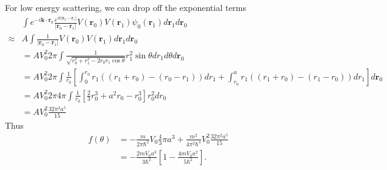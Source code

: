 For low energy scattering, we can drop off the exponential terms
\begin{align*}
            & \int e^{-i\bm k \cdot \bm r_0}
    \frac{e^{ik|\bm r_0-\bm r_1|}}{|\bm r_0 - \bm r_1|}
    V(\bm r_0)V(\bm r_1)\psi_0(\bm r_1)d\bm r_1d\bm r_0 \\
    \approx &
    A\int
    \frac{1}{|\bm r_0 - \bm r_1|}
    V(\bm r_0)V(\bm r_1)d\bm r_1d\bm r_0 \\
            & =A V_0^2 2\pi
    \int \frac{1}{\sqrt{r_0^2+r_1^2-2r_0r_1\cos\theta}}
    r_1^2\sin\theta dr_1d\theta d\bm r_0 \\
            & =AV_0^2 2\pi\int \frac{1}{r_0}\left[
                                                \int_0^{r_0}
                                                r_1((r_1+r_0)-(r_0-r_1))
                                                dr_1
                                                +
                                                \int_{r_0}^a
                                                r_1((r_1+r_0)-(r_1-r_0))
                                                dr_1
                                                \right] d\bm r_0 \\
            & =
    AV_0^2 2\pi 4\pi\int \frac{1}{r_0}
                         [\frac{2}{3}r_0^3 +a^2r_0-r_0^3 ] r_0^2d r_0 \\
            & =AV_0^2 \frac{32\pi^2a^5}{15}
\end{align*}
Thus
\begin{align*}
    f(\theta) & = -\frac{m}{2\pi\hbar^2}V_0\frac{4}{3}\pi a^3
    +\frac{m^2}{4\pi^2\hbar^4}
    V_0^2 \frac{32\pi^2a^5}{15} \\
              & =-\frac{2mV_0a^3}{3\hbar^2}
    \left[
        1 - \frac{4mV_0a^2}{5\hbar^2}
        \right].
\end{align*}

